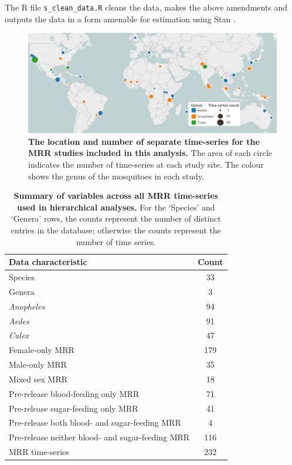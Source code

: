 \documentclass[12pt]{article}
\begin{document}
The R file \verb|s_clean_data.R| cleans the data, makes the above amendments and outputs the data in a form amenable for estimation using Stan \citep{carpenter2016stan}.

\begin{figure}[h]
	\centerline{\includegraphics[width=1.25\textwidth]{./Figure_files/mrr_mapGenusCropped.pdf}}
	\caption{\textbf{The location and number of separate time-series for the MRR studies included in this analysis.} The area of each circle indicates the number of time-series at each study site. The colour shows the genus of the mosquitoes in each study.}
	\label{fig:mrr_lifetimes_map}
\end{figure}


\begin{table}[htbp]
	\centering
	\begin{tabular}{lc}
		\toprule
		\textbf{Data characteristic} & \textbf{Count} \\
		\midrule
		Species & 33 \\
		Genera & 3 \\
		\textit{Anopheles} & 94 \\
		\textit{Aedes} & 91 \\
		\textit{Culex} & 47 \\
		Female-only MRR & 179 \\
		Male-only MRR & 35 \\
		Mixed sex MRR & 18 \\
		Pre-release blood-feeding only MRR & 71 \\
		Pre-release sugar-feeding only MRR & 41 \\
		Pre-release both blood- and sugar-feeding MRR & 4 \\
		Pre-release neither blood- and sugar-feeding MRR & 116 \\
		MRR time-series & 232 \\
		\bottomrule
	\end{tabular}%
	\caption{\textbf{Summary of variables across all MRR time-series used in hierarchical analyses.} For the `Species' and `Genera' rows, the counts represent the number of distinct entries in the database; otherwise the counts represent the number of time series.}
	\label{tab:mrr_aggregateData}%
\end{table}%
\end{document}
